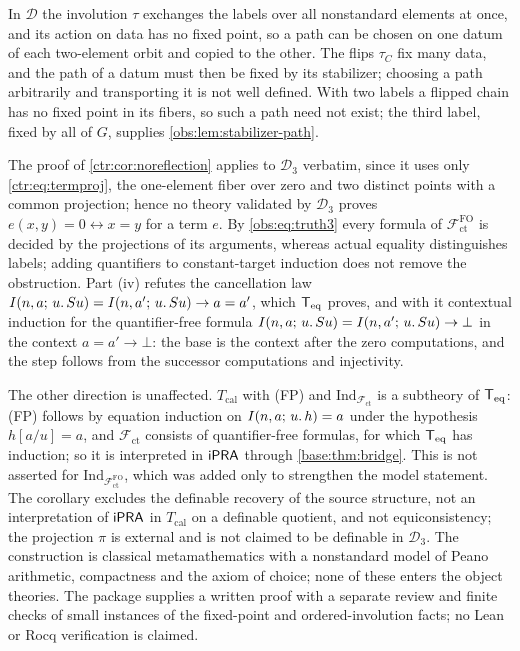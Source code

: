 \begin{remark}
\label{obs:rem:numbering-parameters}
In $\mathcal{D}$ the involution $\tau$ exchanges the labels over all
nonstandard elements at once, and its action on data has no fixed point, so a
path can be chosen on one datum of each two-element orbit and copied to the
other. The flips $\tau_C$ fix many data, and the path of a datum must then be
fixed by its stabilizer; choosing a path arbitrarily and transporting it is
not well defined. With two labels a flipped chain has no fixed point in its
fibers, so such a path need not exist; the third label, fixed by all of $G$,
supplies \cref{obs:lem:stabilizer-path}.

The proof of \cref{ctr:cor:noreflection} applies to $\mathcal{D}_3$ verbatim,
since it uses only \eqref{ctr:eq:termproj}, the one-element fiber over zero
and two distinct points with a common projection; hence no theory validated by
$\mathcal{D}_3$ proves $e(x,y)=0\leftrightarrow x=y$ for a term $e$. By
\eqref{obs:eq:truth3} every formula of $\mathcal{F}^{\mathrm{FO}}_{\mathrm{ct}}$
is decided by the projections of its arguments, whereas actual equality
distinguishes labels; adding quantifiers to constant-target induction does not
remove the obstruction. Part (iv) refutes the cancellation law
$I(n,a;\,u.\,S u)=I(n,a';\,u.\,S u)\to a=a'$, which $\mathsf{T}_{\mathrm{eq}}$ proves,
and with it contextual induction for the quantifier-free formula
$I(n,a;\,u.\,S u)=I(n,a';\,u.\,S u)\to\bot$ in the context
$a=a'\to\bot$: the base is the context after the zero computations, and the
step follows from the successor computations and injectivity.

The other direction is unaffected. $T_{\mathrm{cal}}$ with (FP) and
$\mathrm{Ind}_{\mathcal{F}_{\mathrm{ct}}}$ is a subtheory of $\mathsf{T}_{\mathrm{eq}}$: (FP)
follows by equation induction on $I(n,a;\,u.\,h)=a$ under the hypothesis
$h[a/u]=a$, and $\mathcal{F}_{\mathrm{ct}}$ consists of quantifier-free
formulas, for which $\mathsf{T}_{\mathrm{eq}}$ has induction; so it is interpreted in $\mathsf{iPRA}$
through \cref{base:thm:bridge}. This is not asserted for
$\mathrm{Ind}_{\mathcal{F}^{\mathrm{FO}}_{\mathrm{ct}}}$, which was added only
to strengthen the model statement. The corollary excludes the definable
recovery of the source structure, not an interpretation of $\mathsf{iPRA}$ in
$T_{\mathrm{cal}}$ on a definable quotient, and not equiconsistency; the
projection $\pi$ is external and is not claimed to be definable in
$\mathcal{D}_3$. The construction is classical metamathematics with a
nonstandard model of Peano arithmetic, compactness and the axiom of choice;
none of these enters the object theories. The package supplies a written
proof with a separate review and finite checks of small instances of the
fixed-point and ordered-involution facts; no Lean or Rocq verification is
claimed.
\end{remark}

